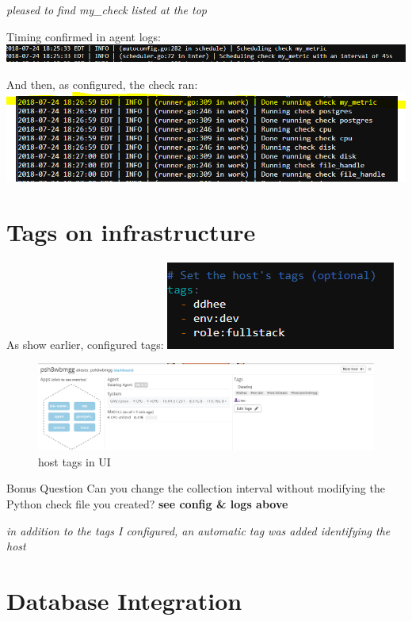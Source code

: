 \documentclass[11pt]{article}
\makeatletter
\def\maxwidth{\ifdim\Gin@nat@width>\linewidth\linewidth
    \else\Gin@nat@width\fi}
\let\Oldincludegraphics\includegraphics
\renewcommand{\includegraphics}[1]{\Oldincludegraphics[width=.8\maxwidth]{#1}}
\makeatother
\begin{document}
\emph{pleased to find my\_check listed at the top}

Timing confirmed in agent logs: \includegraphics{images/45.PNG}

And then, as configured, the check ran:
\includegraphics{images/check_ran.PNG}

    \section{Tags on infrastructure}\label{tags-on-infrastructure}

    As show earlier, configured tags: \includegraphics{images/tic.PNG}

\begin{figure}
\centering
\includegraphics{images/host_tags.PNG}
\caption{host tags in UI}
\end{figure}

Bonus Question Can you change the collection interval without modifying
the Python check file you created? \textbf{see config \& logs above}

\emph{in addition to the tags I configured, an automatic tag was added
identifying the host}

    \section{Database Integration}\label{database-integration}
\end{document}
